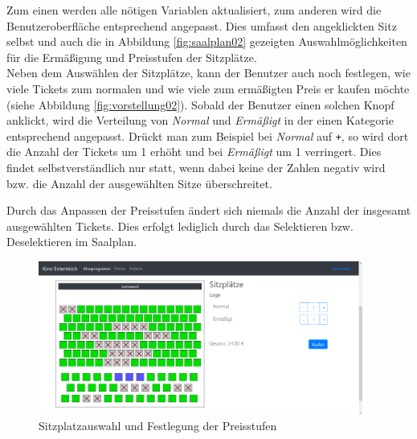 Zum einen werden alle nötigen Variablen aktualisiert, zum anderen wird die Benutzeroberfläche entsprechend angepasst.
Dies umfasst den angeklickten Sitz selbst und auch die in Abbildung \vref{fig:saalplan02} gezeigten Auswahlmöglichkeiten für die Ermäßigung und Preisstufen der Sitzplätze. \\

Neben dem Auswählen der Sitzplätze, kann der Benutzer auch noch festlegen, wie viele Tickets zum normalen und wie viele zum ermäßigten Preis er kaufen möchte (siehe Abbildung \vref{fig:vorstellung02}).
Sobald der Benutzer einen solchen Knopf anklickt, wird die Verteilung von \textit{Normal} und \textit{Ermäßigt} in der einen Kategorie entsprechend angepasst.
Drückt man zum Beispiel bei \textit{Normal} auf \texttt{+}, so wird dort die Anzahl der Tickets um 1 erhöht und bei \textit{Ermäßigt} um 1 verringert.
Dies findet selbstverständlich nur statt, wenn dabei keine der Zahlen negativ wird bzw. die Anzahl der ausgewählten Sitze überschreitet.

Durch das Anpassen der Preisstufen ändert sich niemals die Anzahl der insgesamt ausgewählten Tickets.
Dies erfolgt lediglich durch das Selektieren bzw. Deselektieren im Saalplan.

\begin{figure}[ht]
	\centering
	\includegraphics[width=0.95\textwidth]{img/screenshots/vorstellung02}
	\captionsetup{format=hang}
	\caption{Sitzplatzauswahl und Festlegung der Preisstufen}
	\label{fig:vorstellung02}
\end{figure}

